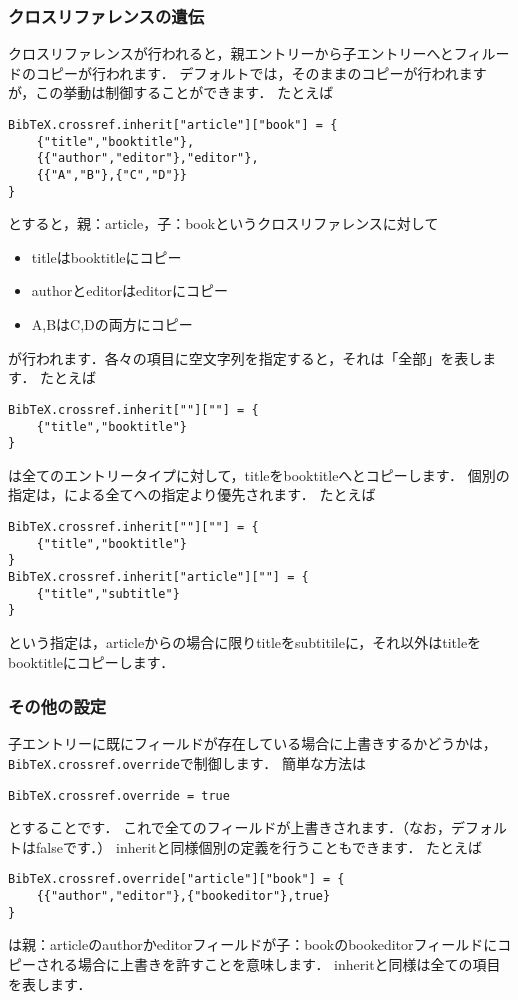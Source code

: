 \documentclass[a4paper]{ltjsarticle}
\newcommand*{\luavar}[1]{\texttt{#1}}
\begin{document}
\subsubsection{クロスリファレンスの遺伝}
クロスリファレンスが行われると，親エントリーから子エントリーへとフィルードのコピーが行われます．
デフォルトでは，そのままのコピーが行われますが，この挙動は制御することができます．
たとえば
\begin{lstlisting}
BibTeX.crossref.inherit["article"]["book"] = {
    {"title","booktitle"},
    {{"author","editor"},"editor"},
    {{"A","B"},{"C","D"}}
}
\end{lstlisting}
とすると，親：article，子：bookというクロスリファレンスに対して
\begin{itemize}
\item titleはbooktitleにコピー
\item authorとeditorはeditorにコピー
\item A,BはC,Dの両方にコピー
\end{itemize}
が行われます．各々の項目に空文字列\luastring{}を指定すると，それは「全部」を表します．
たとえば
\begin{lstlisting}
BibTeX.crossref.inherit[""][""] = {
    {"title","booktitle"}
}
\end{lstlisting}
は全てのエントリータイプに対して，titleをbooktitleへとコピーします．
個別の指定は，\luastring{}による全てへの指定より優先されます．
たとえば
\begin{lstlisting}
BibTeX.crossref.inherit[""][""] = {
    {"title","booktitle"}
}
BibTeX.crossref.inherit["article"][""] = {
    {"title","subtitle"}
}
\end{lstlisting}
という指定は，articleからの場合に限りtitleをsubtitileに，それ以外はtitleをbooktitleにコピーします．

\subsubsection{その他の設定}
子エントリーに既にフィールドが存在している場合に上書きするかどうかは，\luavar{BibTeX.crossref.override}で制御します．
簡単な方法は
\begin{lstlisting}
BibTeX.crossref.override = true
\end{lstlisting}
とすることです．
これで全てのフィールドが上書きされます．（なお，デフォルトはfalseです．）
inheritと同様個別の定義を行うこともできます．
たとえば
\begin{lstlisting}
BibTeX.crossref.override["article"]["book"] = {
    {{"author","editor"},{"bookeditor"},true}
}
\end{lstlisting}
は親：articleのauthorかeditorフィールドが子：bookのbookeditorフィールドにコピーされる場合に上書きを許すことを意味します．
inheritと同様\luastring{}は全ての項目を表します．
\end{document}
